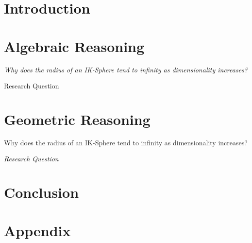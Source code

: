 \documentclass[a4paper, 12pt]{report}
\theoremstyle{definition}
\begin{document}
    
    
    
    \singlespacing
    
    \doublespacing
    
    
    \chapter{Introduction}
    
    
    \chapter{Algebraic Reasoning}
    \epigraph{\textit{Why does the radius of an IK-Sphere tend to infinity as dimensionality increases?}}{Research Question}
    
    
    \chapter{Geometric Reasoning}
    \epigraph{Why does the radius of an IK-Sphere tend to infinity as dimensionality increases?}{\textit{Research Question}}
    
    
    \chapter{Conclusion}
    
    
    \printbibliography
    
    \appendix
    \chapter{Appendix}
    
\end{document}
